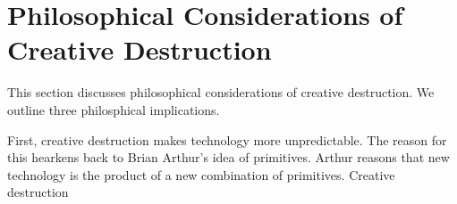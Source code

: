\documentclass[11pt]{article}
\begin{document}
\section{Philosophical Considerations of Creative Destruction}
This section discusses philosophical considerations of creative destruction.
We outline three philosphical implications.

First, creative destruction makes technology more unpredictable.
The reason for this hearkens back to Brian Arthur's idea of primitives. 
Arthur reasons that new technology is the product of a new combination of primitives. 
Creative destruction 



\end{document}
